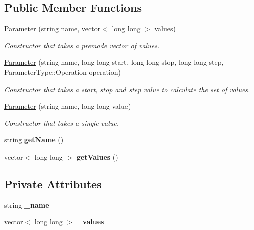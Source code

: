 \subsection*{Public Member Functions}
\begin{DoxyCompactItemize}
\item 
\hyperlink{classParameter_aac446e420544c143acb80697f6c42cd1}{Parameter} (string name, vector$<$ long long $>$ values)
\begin{DoxyCompactList}\small\item\em Constructor that takes a premade vector of values. \end{DoxyCompactList}\item 
\hyperlink{classParameter_aaf73d37265f1874fceda7e3f033be9ca}{Parameter} (string name, long long start, long long stop, long long step, Parameter\-Type\-::\-Operation operation)
\begin{DoxyCompactList}\small\item\em Constructor that takes a start, stop and step value to calculate the set of values. \end{DoxyCompactList}\item 
\hyperlink{classParameter_af440f581789a4ba9ced1fee57fddcf80}{Parameter} (string name, long long value)
\begin{DoxyCompactList}\small\item\em Constructor that takes a single value. \end{DoxyCompactList}\item 
\hypertarget{classParameter_ac5b7e062949592809028150542f98f1b}{string {\bfseries get\-Name} ()}\label{classParameter_ac5b7e062949592809028150542f98f1b}

\item 
\hypertarget{classParameter_af7c0a5755fe6de37fa0e1635206fb759}{vector$<$ long long $>$ {\bfseries get\-Values} ()}\label{classParameter_af7c0a5755fe6de37fa0e1635206fb759}

\end{DoxyCompactItemize}
\subsection*{Private Attributes}
\begin{DoxyCompactItemize}
\item 
\hypertarget{classParameter_a2874e1c49d59ccd13f9cf59defd64699}{string {\bfseries \-\_\-name}}\label{classParameter_a2874e1c49d59ccd13f9cf59defd64699}

\item 
\hypertarget{classParameter_a2e45054564b09ff05efa5666e08604af}{vector$<$ long long $>$ {\bfseries \-\_\-values}}\label{classParameter_a2e45054564b09ff05efa5666e08604af}

\end{DoxyCompactItemize}


